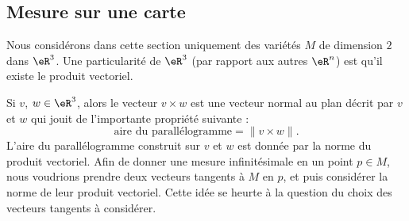 \subsection{Mesure sur une carte}

Nous considérons dans cette section uniquement des variétés $M$ de dimension $2$ dans $\eR^3$.  Une particularité de $\eR^3$ (par rapport aux autres $\eR^n$) est qu'il existe le produit vectoriel.

Si $v$, $w\in\eR^3$, alors le vecteur $v\times w$ est une vecteur normal au plan décrit par $v$ et $w$ qui jouit de l'importante propriété suivante :
\begin{equation}
	\text{aire du parallélogramme}=\| v\times w \|.
\end{equation}
L'aire du parallélogramme construit sur $v$ et $w$ est donnée par la norme du produit vectoriel. Afin de donner une mesure infinitésimale en un point $p\in M$, nous voudrions prendre deux vecteurs tangents à $M$ en $p$, et puis considérer la norme de leur produit vectoriel. Cette idée se heurte à la question du choix des vecteurs tangents à considérer.


